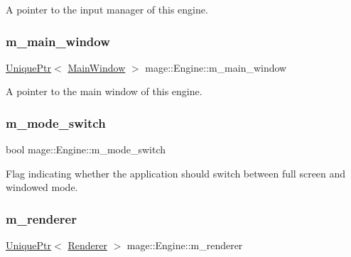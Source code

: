 A pointer to the input manager of this engine. \hypertarget{classmage_1_1_engine_a3aea7e8c0c1247cac570334a3d3543d6}{}\label{classmage_1_1_engine_a3aea7e8c0c1247cac570334a3d3543d6} 
\subsubsection{\texorpdfstring{m\+\_\+main\+\_\+window}{m\_main\_window}}
{\footnotesize\ttfamily \hyperlink{namespacemage_a8c307fbcc33bce9b7f2aa4c26c3b95cf}{Unique\+Ptr}$<$ \hyperlink{classmage_1_1_main_window}{Main\+Window} $>$ mage\+::\+Engine\+::m\+\_\+main\+\_\+window\hspace{0.3cm}{\ttfamily [private]}}

A pointer to the main window of this engine. \hypertarget{classmage_1_1_engine_aa5cb2e0b7bb2c4a9020e79ab832ee221}{}\label{classmage_1_1_engine_aa5cb2e0b7bb2c4a9020e79ab832ee221} 
\subsubsection{\texorpdfstring{m\+\_\+mode\+\_\+switch}{m\_mode\_switch}}
{\footnotesize\ttfamily bool mage\+::\+Engine\+::m\+\_\+mode\+\_\+switch\hspace{0.3cm}{\ttfamily [private]}}

Flag indicating whether the application should switch between full screen and windowed mode. \hypertarget{classmage_1_1_engine_a1248b7c21bc8256c72d372c12ed1ee68}{}\label{classmage_1_1_engine_a1248b7c21bc8256c72d372c12ed1ee68} 
\subsubsection{\texorpdfstring{m\+\_\+renderer}{m\_renderer}}
{\footnotesize\ttfamily \hyperlink{namespacemage_a8c307fbcc33bce9b7f2aa4c26c3b95cf}{Unique\+Ptr}$<$ \hyperlink{classmage_1_1_renderer}{Renderer} $>$ mage\+::\+Engine\+::m\+\_\+renderer\hspace{0.3cm}{\ttfamily [private]}}

